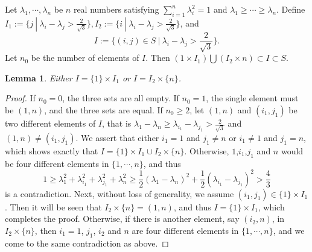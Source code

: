\documentclass[a4paper,11pt]{amsart}
\numberwithin{equation}{section} \theoremstyle{plain}
\newtheorem{lem}[thm]{Lemma}
\begin{document}
Let $\lambda_1, \cdots, \lambda_n$ be $n$ real numbers satisfying $\sum_{i=1}^n\lambda_i^2=1$ and $\lambda_1\geq\cdots\geq\lambda_n$. Define
$I_1:=\{j\ |\ \lambda_i-\lambda_j>\frac2{\sqrt{3}}\}, I_2:=\{i\ |\ \lambda_i-\lambda_j>\frac2{\sqrt{3}}\}$, and $$I:=\{(i,j)\in S\ |\ \lambda_i-\lambda_j>\frac2{\sqrt{3}}\}.$$
Let $n_0$ be the number of elements of $I$. Then $({1}\times I_1)\bigcup(I_2\times {n})\subset I\subset S$.

\begin{lem}\label{lem1}
Either $I=\{1\}\times I_1$ or $I=I_2\times\{n\}$.
\end{lem}
\begin{proof}
If $n_0=0$, the three sets are all empty. If $n_0=1$, the single element must be $(1,n)$, and the three sets are equal. If $n_0\geq2$, let $(1,n)$ and $(i_1,j_1)$ be two different elements of $I$, that is
$\lambda_1-\lambda_n\geq\lambda_{i_1}-\lambda_{j_1}>\frac2{\sqrt{3}}$ and $(1,n)\neq(i_1,j_1)$. We assert that either  $i_1=1$ and $j_1\neq n$ or $i_1\neq1$ and $j_1=n$, which shows exactly that $I=\{1\}\times I_1\cup I_2\times\{n\}$. Otherwise, $1$,$i_1$,$j_1$ and $n$ would be four different elements in $\{1,\cdots,n\}$, and thus
$$
1\geq\lambda^2_1+\lambda^2_{i_1}+\lambda^2_{j_1}+\lambda^2_n\geq\frac{1}2(\lambda_1-\lambda_n)^2+\frac{1}2(\lambda_{i_1}-\lambda_{j_1})^2>\frac{4}{3}
$$
is a contradiction. Next, without loss of generality, we assume  $(i_1,j_1)\in\{1\}\times I_1$. Then it will be seen that $I_2\times\{n\}={(1,n)}$, and thus $I=\{1\}\times I_1$, which completes the proof. Otherwise, if there is another element, say $(i_2,n)$, in $I_2\times\{n\}$, then $i_1=1$, $j_1$, $i_2$ and $n$ are four different elements in $\{1,\cdots,n\}$, and we come to the same contradiction as above.
\end{proof}
\end{document}
